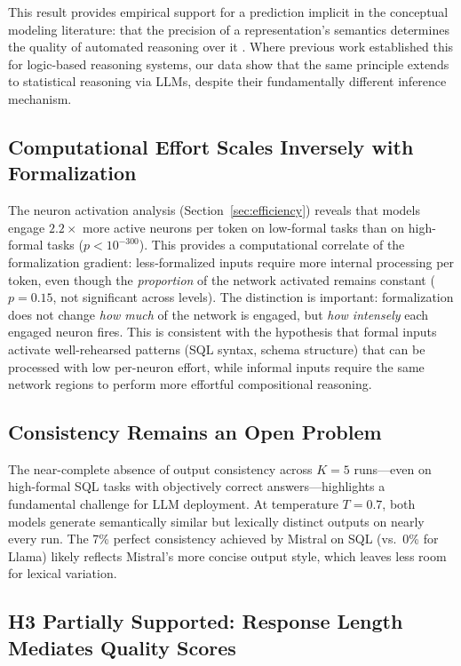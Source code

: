 \documentclass[runningheads]{llncs}
\begin{document}
This result provides empirical support for a prediction implicit in the conceptual modeling literature: that the precision of a representation's semantics determines the quality of automated reasoning over it \cite{olive2007conceptual}. Where previous work established this for logic-based reasoning systems, our data show that the same principle extends to statistical reasoning via LLMs, despite their fundamentally different inference mechanism.

\subsection{Computational Effort Scales Inversely with Formalization}

The neuron activation analysis (Section~\ref{sec:efficiency}) reveals that models engage $2.2\times$ more active neurons per token on low-formal tasks than on high-formal tasks ($p < 10^{-300}$). This provides a computational correlate of the formalization gradient: less-formalized inputs require more internal processing per token, even though the \emph{proportion} of the network activated remains constant ($p = 0.15$, not significant across levels). The distinction is important: formalization does not change \emph{how much} of the network is engaged, but \emph{how intensely} each engaged neuron fires. This is consistent with the hypothesis that formal inputs activate well-rehearsed patterns (SQL syntax, schema structure) that can be processed with low per-neuron effort, while informal inputs require the same network regions to perform more effortful compositional reasoning.

\subsection{Consistency Remains an Open Problem}

The near-complete absence of output consistency across $K\!=\!5$ runs---even on high-formal SQL tasks with objectively correct answers---highlights a fundamental challenge for LLM deployment. At temperature $T\!=\!0.7$, both models generate semantically similar but lexically distinct outputs on nearly every run. The 7\% perfect consistency achieved by Mistral on SQL (vs.\ 0\% for Llama) likely reflects Mistral's more concise output style, which leaves less room for lexical variation.

\subsection{H3 Partially Supported: Response Length Mediates Quality Scores}
\end{document}
